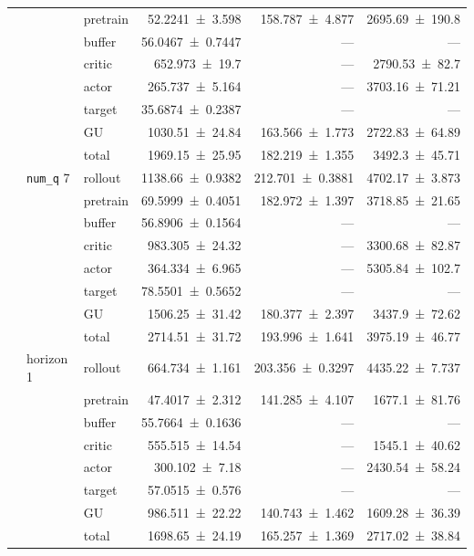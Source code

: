 {\begin{longtable}{@{}lllrrr@{}}
     &  & pretrain & \num{52.2241+-3.598} & \num{158.787+-4.877} & \num{2695.69+-190.8} \\
     &  & buffer & \num{56.0467+-0.7447} & --- & --- \\
     &  & critic & \num{652.973+-19.7} & --- & \num{2790.53+-82.7} \\
     &  & actor & \num{265.737+-5.164} & --- & \num{3703.16+-71.21} \\
     &  & target & \num{35.6874+-0.2387} & --- & --- \\
     &  & GU & \num{1030.51+-24.84} & \num{163.566+-1.773} & \num{2722.83+-64.89} \\
     &  & total & \num{1969.15+-25.95} & \num{182.219+-1.355} & \num{3492.3+-45.71} \\
    \addlinespace[2pt]
     & \texttt{num\_q} 7 & rollout & \num{1138.66+-0.9382} & \num{212.701+-0.3881} & \num{4702.17+-3.873} \\
     &  & pretrain & \num{69.5999+-0.4051} & \num{182.972+-1.397} & \num{3718.85+-21.65} \\
     &  & buffer & \num{56.8906+-0.1564} & --- & --- \\
     &  & critic & \num{983.305+-24.32} & --- & \num{3300.68+-82.87} \\
     &  & actor & \num{364.334+-6.965} & --- & \num{5305.84+-102.7} \\
     &  & target & \num{78.5501+-0.5652} & --- & --- \\
     &  & GU & \num{1506.25+-31.42} & \num{180.377+-2.397} & \num{3437.9+-72.62} \\
     &  & total & \num{2714.51+-31.72} & \num{193.996+-1.641} & \num{3975.19+-46.77} \\
    \addlinespace[2pt]
     & horizon 1 & rollout & \num{664.734+-1.161} & \num{203.356+-0.3297} & \num{4435.22+-7.737} \\
     &  & pretrain & \num{47.4017+-2.312} & \num{141.285+-4.107} & \num{1677.1+-81.76} \\
     &  & buffer & \num{55.7664+-0.1636} & --- & --- \\
     &  & critic & \num{555.515+-14.54} & --- & \num{1545.1+-40.62} \\
     &  & actor & \num{300.102+-7.18} & --- & \num{2430.54+-58.24} \\
     &  & target & \num{57.0515+-0.576} & --- & --- \\
     &  & GU & \num{986.511+-22.22} & \num{140.743+-1.462} & \num{1609.28+-36.39} \\
     &  & total & \num{1698.65+-24.19} & \num{165.257+-1.369} & \num{2717.02+-38.84} \\

\end{longtable}}
